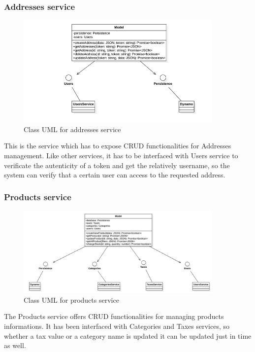 \subsubsection{Addresses service}
\begin{figure}[H]
    \includegraphics[width=0.9\textwidth]{res/images/class-diagrams/addresses.png}
    \caption{Class UML for addresses service}
\end{figure}
This is the service which has to expose CRUD functionalities for Addresses management. Like other services, it has to be interfaced with Users service to verificate the
autenticity of a token and get the relatively username, so the system can verify that a certain user can access to the requested address. 

\subsubsection{Products service}
\begin{figure}[H]
    \includegraphics[width=0.9\textwidth]{res/images/class-diagrams/products.png}
    \caption{Class UML for products service}
\end{figure}
The Products service offers CRUD functionalities for managing products informations. It has been interfaced with Categories and Taxes services, so whether a tax value or a category name
is updated it can be updated just in time as well.

